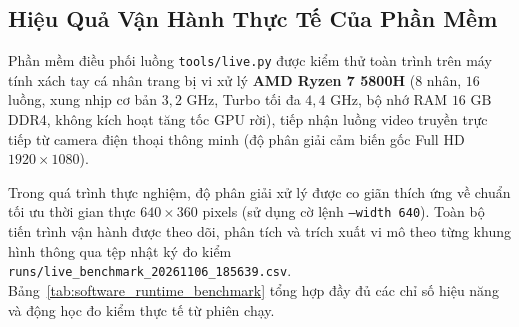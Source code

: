 \subsection{Hiệu Quả Vận Hành Thực Tế Của Phần Mềm}
\label{subsec:hieu_qua_phan_mem}

Phần mềm điều phối luồng \texttt{tools/live.py} được kiểm thử toàn trình trên máy tính xách tay cá nhân trang bị vi xử lý \textbf{AMD Ryzen 7 5800H} ($8$ nhân, $16$ luồng, xung nhịp cơ bản $3,2\text{ GHz}$, Turbo tối đa $4,4\text{ GHz}$, bộ nhớ RAM $16\text{ GB}$ DDR4, không kích hoạt tăng tốc GPU rời), tiếp nhận luồng video truyền trực tiếp từ camera điện thoại thông minh (độ phân giải cảm biến gốc Full HD $1920 \times 1080$). 

Trong quá trình thực nghiệm, độ phân giải xử lý được co giãn thích ứng về chuẩn tối ưu thời gian thực $640 \times 360$ pixels (sử dụng cờ lệnh \texttt{--width 640}). Toàn bộ tiến trình vận hành được theo dõi, phân tích và trích xuất vi mô theo từng khung hình thông qua tệp nhật ký đo kiểm \texttt{runs/live\_benchmark\_20261106\_185639.csv}. Bảng~\ref{tab:software_runtime_benchmark} tổng hợp đầy đủ các chỉ số hiệu năng và động học đo kiểm thực tế từ phiên chạy.

